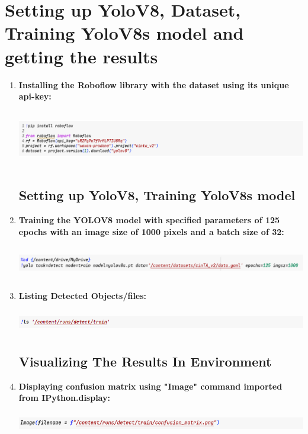 \documentclass[12 pt]{report}
\begin{document}
\section{Setting up YoloV8, Dataset, Training YoloV8s model and getting the results}
 {
  \begin{enumerate}
    \item \textbf{Installing the Roboflow library with the dataset using its unique api-key:}
          \begin{center}
            \includegraphics[width=17cm, height=2.5cm]{Pip insall roboflow.png}
          \end{center}
          \subsection{Setting up YoloV8, Training YoloV8s model}
    \item \textbf{Training the YOLOV8 model with specified parameters of 125 epochs with an image size of 1000 pixels and a batch size of 32:}
          \begin{center}
            \includegraphics[width=17cm, height=1.5cm]{Training Yolov8model.png}
          \end{center}
    \item \textbf{Listing Detected Objects/files:}
          \begin{center}
            \includegraphics[width=17cm, height=1cm]{Listing out the files created after trining .png}
          \end{center}

          \vspace{1.34cm}
          \subsection{Visualizing The Results In Environment}
    \item \textbf{Displaying confusion matrix using "Image" command imported from IPython.display:}
          \begin{center}
            \includegraphics[width=17cm, height=1cm]{displaying the confusion matrix in environment.png}
          \end{center}


\end{enumerate}}
\end{document}
